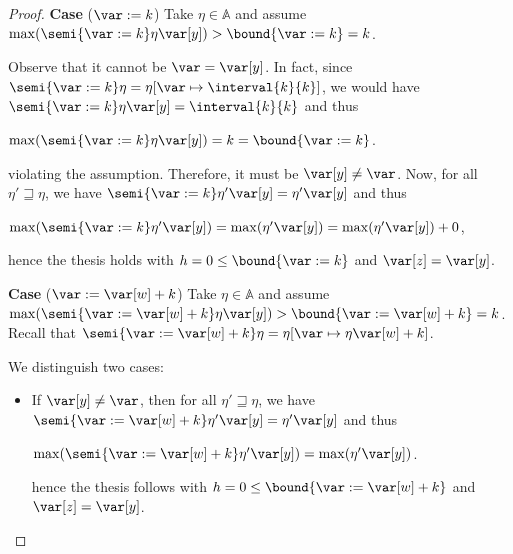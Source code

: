 \begin{proof}
  

  


  
  \medskip
  
  \noindent
  \textbf{Case} (\(\var := k\))
  Take \(\eta \in \mathbb{A}\) and assume
  \(\max(\semi{\var := k}\eta \var[y]) > \bound{\var := k} = k\).

  Observe that it cannot be \(\var = \var[y]\). In fact, since
  \(\semi{\var := k}\eta = \eta[\var \mapsto \interval{k}{k}]\), we would have
  \(\semi{\var := k}\eta \var[y] = \interval{k}{k}\) and thus
  \begin{center}
    \(\max(\semi{\var := k}\eta \var[y]) = k  = \bound{\var := k}\).
  \end{center}
  violating the assumption.
  Therefore, it must be \(\var[y] \neq \var\). Now, for all
  \(\eta' \sqsupseteq \eta\), we have
  \(\semi{\var := k}\eta' \var[y] = \eta' \var[y]\) and thus
  \begin{center}
    \(\max(\semi{\var := k}\eta' \var[y]) = \max(\eta' \var[y]) =
    \max(\eta' \var[y]) + 0\),
  \end{center}
  hence the thesis holds with \(h =0 \leq \bound{\var :=k}\) and \(\var[z] = \var[y]\).
  

  
  \medskip
  
  \noindent
  \textbf{Case} (\(\var := \var[w] + k\))
  Take \(\eta \in \mathbb{A}\) and assume
  \(\max(\semi{\var := \var[w] + k}\eta \var[y]) > \bound{\var := \var[w] + k} = k\).
  Recall that
  \(\semi{\var := \var[w] + k}\eta = \eta[\var \mapsto \eta \var[w] + k]\).
  
  We distinguish two cases:
  \begin{itemize}
    
  \item If \(\var[y] \neq \var\), then for all \(\eta' \sqsupseteq \eta\), we have
    \(\semi{\var := \var[w] + k}\eta' \var[y] = \eta' \var[y]\) and thus
    \begin{center}
      \(\max(\semi{\var := \var[w] + k}\eta' \var[y]) = \max(\eta' \var[y])\).
    \end{center}
    hence the thesis follows with
    \(h =0 \leq \bound{\var := \var[w] + k}\) and \(\var[z] = \var[y]\).
    

\end{itemize}
\end{proof}
